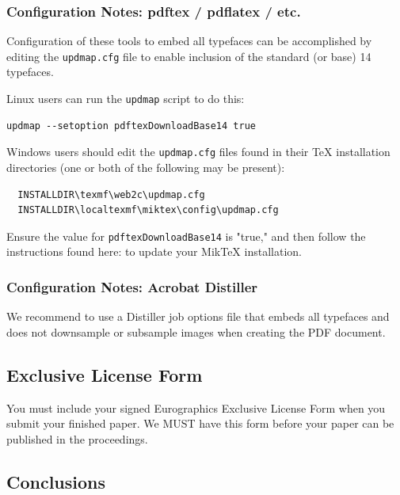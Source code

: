 \subsubsection*{Configuration Notes: pdftex / pdflatex / etc.}

\noindent
Configuration of these tools to embed all typefaces can be accomplished by editing the \texttt{updmap.cfg} file
to enable inclusion of the standard (or base) 14 typefaces.

Linux users can run the \texttt{updmap} script to do this:
\begin{verbatim}
updmap --setoption pdftexDownloadBase14 true
\end{verbatim}

Windows users should edit the \texttt{updmap.cfg} files found in their TeX installation directories (one or both
of the following may be present):
\begin{verbatim}
  INSTALLDIR\texmf\web2c\updmap.cfg
  INSTALLDIR\localtexmf\miktex\config\updmap.cfg
\end{verbatim}

Ensure the value for \texttt{pdftexDownloadBase14} is "true," and then follow the instructions found here:
 to update your MikTeX installation.

\subsubsection*{Configuration Notes: Acrobat Distiller}

We recommend to use a Distiller job options file that embeds
all typefaces and does not downsample or subsample images when creating the PDF document.
\subsection{Exclusive License Form}

You must include your signed Eurographics Exclusive License Form 
when you submit your finished paper. We MUST have this form before
your paper can be published in the proceedings.

\subsection{Conclusions}

